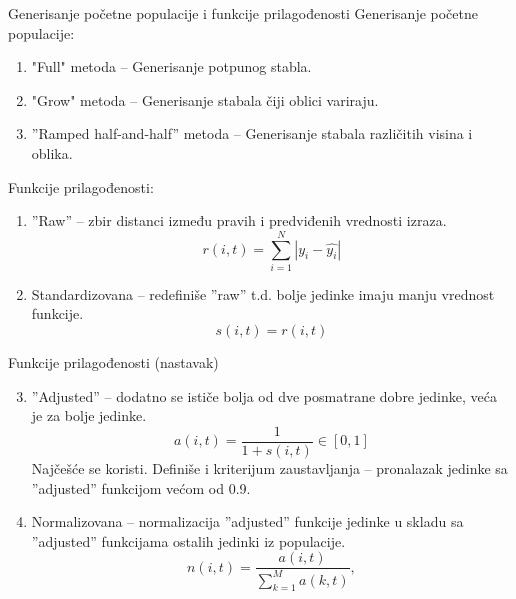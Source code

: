 \documentclass{beamer}
\begin{document}
\begin{frame}{Generisanje početne populacije i funkcije prilagođenosti}
Generisanje početne populacije:
\begin{enumerate}
    \small 
    \item "Full" metoda -- Generisanje potpunog stabla.
    \item "Grow" metoda -- Generisanje stabala čiji oblici variraju.
    \item ''Ramped half-and-half'' metoda -- Generisanje stabala različitih visina i oblika.
\end{enumerate}
Funkcije prilagođenosti:
\begin{enumerate}
    \small 
    \item ''Raw'' -- zbir distanci između pravih i predviđenih vrednosti izraza.
    \[ r(i,t) = \sum_{i=1}^{N}|y_i - \hat{y_i}|  \]
    \item Standardizovana -- redefiniše ''raw'' t.d. bolje jedinke imaju manju vrednost funkcije.
    \[ s(i,t) = r(i,t) \]
\end{enumerate}  
\end{frame}



\begin{frame}{Funkcije prilagođenosti (nastavak)}
\begin{enumerate}
\setcounter{enumi}{2}
    \small
    \item ''Adjusted'' -- dodatno se ističe bolja od dve posmatrane dobre jedinke, veća je za bolje jedinke.
    \[ a(i,t) = \frac{1}{1 + s(i,t)} \in [0,1] \]
    Najčešće se koristi. Definiše i kriterijum zaustavljanja -- pronalazak jedinke sa ''adjusted'' funkcijom većom od 0.9. 
    \item Normalizovana -- normalizacija ''adjusted'' funkcije jedinke u skladu sa ''adjusted'' funkcijama ostalih jedinki iz populacije.
    \[ n(i,t) = \frac{a(i,t)}{\sum_{k=1}^{M}a(k,t)}, \]
\end{enumerate}
\end{frame}
\end{document}
